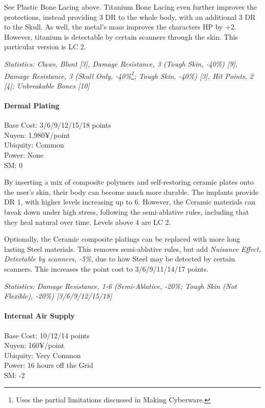 \begin{multicols*}{3}
	See Plastic Bone Lacing above. Titanium Bone Lacing even further improves the protections, instead providing 3 DR to the whole body, with an additional 3 DR to the Skull. As well, the metal's mass improves the characters HP by +2. However, titanium is detectable by certain scanners through the skin. This particular version is LC 2.
	
	\textit{\textcolor{OliveGreen}{Statistics: Claws, Blunt [3], Damage Resistance, 3 (Tough Skin, -40\%) [9], Damage Resistance, 3 (Skull Only, -40\%\footnote {Uses the partial limitations discussed in Making Cyberware.}; Tough Skin, -40\%) [3], Hit Points, 2 [4]; Unbreakable Bones [10]}}
	
	\paragraph{Dermal Plating}
	\begin{flushright}
		Base Cost: 3/6/9/12/15/18 points\\
		Nuyen: 1,980¥/point\\
		Ubiquity: Common\\
		Power: None\\
		SM: 0
	\end{flushright}
	
	By inserting a mix of composite polymers and self-restoring ceramic plates onto the user's skin, their body can become much more durable. The implants provide DR 1, with higher levels increasing up to 6. However, the Ceramic materials can break down under high stress, following the semi-ablative rules, including that they heal natural over time. Levels above 4 are LC 2.
	
	Optionally, the Ceramic composite platings can be replaced with more long lasting Steel materials. This removes semi-ablative rules, but add \textit{Nuisance Effect, Detectable by scanners, -5\%}, due to how Steel may be detected by certain scanners. This increases the point cost to 3/6/9/11/14/17 points. 
	
	\textit{\textcolor{OliveGreen}{Statistics: Damage Resistance, 1-6 (Semi-Ablative, -20\%; Tough Skin (Not Flexible), -20\%) [3/6/9/12/15/18]}}
	
	\paragraph{Internal Air Supply}
	\begin{flushright}
		Base Cost: 10/12/14 points\\
		Nuyen: 160¥/point\\
		Ubiquity: Very Common\\
		Power: 16 hours off the Grid\\
		SM: -2
	\end{flushright}
	

\end{multicols*}
